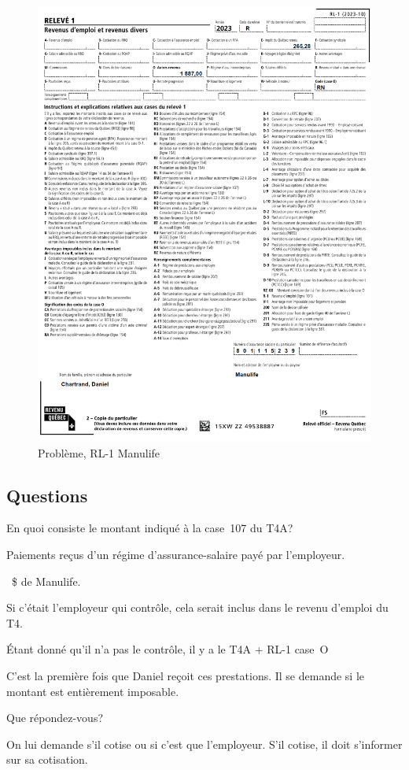 \begin{figure}
	\centering
	\includegraphics[width=.9\textwidth]{probleme/chapitre-2/RL1-Manulife.png}
	\caption[]{Problème, RL-1 Manulife}
	\label{fig:Chap2RL1Manulife}
\end{figure}


\subsection{Questions}
\setcounter{question}{0}
\begin{question}
	En quoi consiste le montant indiqué à la case~107 du T4A?
\end{question}
Paiements reçus d'un régime d'assurance-salaire payé par l'employeur.

~\$ de Manulife.

Si c'était l'employeur qui contrôle, cela serait inclus dans le revenu d'emploi du T4.

Étant donné qu'il n'a pas le contrôle, il y a le T4A + RL-1 case~O

\begin{question}
	C'est la première fois que Daniel reçoit ces prestations. Il se demande si le montant est entièrement imposable. 
	
	Que répondez-vous?
\end{question}
On lui demande s'il cotise ou si c'est que l'employeur. S'il cotise, il doit s'informer sur sa cotisation.

